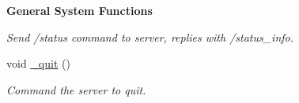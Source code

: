 \begin{Indent}{\bf General System Functions}
\begin{DoxyCompactItemize}
\begin{DoxyCompactList}\small\item\em Send /status command to server, replies with /status\-\_\-info. \end{DoxyCompactList}\item 
\hypertarget{classColliderPlusPlus_1_1Client__Server_ae6c23572a95f5645687ac50167f28ace}{void \hyperlink{classColliderPlusPlus_1_1Client__Server_ae6c23572a95f5645687ac50167f28ace}{\-\_\-quit} ()}\label{classColliderPlusPlus_1_1Client__Server_ae6c23572a95f5645687ac50167f28ace}

\begin{DoxyCompactList}\small\item\em Command the server to quit. \end{DoxyCompactList}\end{DoxyCompactItemize}
\end{Indent}
